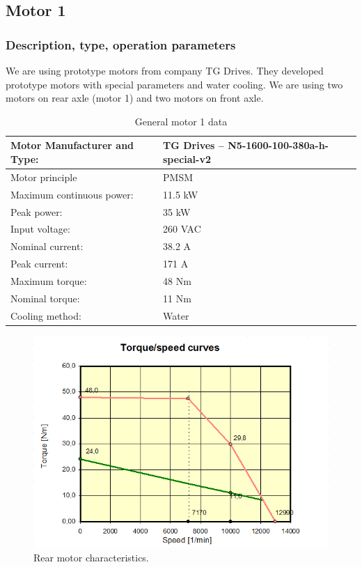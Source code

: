 \subsection{Motor 1}

\subsubsection{Description, type, operation parameters}

We are using prototype motors from company TG Drives. They developed prototype motors with special parameters and water cooling. We are using two motors on rear axle (motor 1) and two motors on front axle.
\begin{table}[H]
	\centering
	\caption{General motor 1 data}
	\begin{tabularx}{\textwidth}{|X|X|}\hline
		Motor Manufacturer and Type: & TG Drives – N5-1600-100-380a-h-special-v2 \\[\TableSize]\hline
		Motor principle & PMSM \\[\TableSize]\hline
		Maximum continuous power: & 11.5 kW \\[\TableSize]\hline
		Peak power: & 35 kW \\[\TableSize]\hline
		Input voltage: & 260 VAC \\[\TableSize]\hline
		Nominal current: & 38.2 A \\[\TableSize]\hline
		Peak current: & 171 A \\[\TableSize]\hline
		Maximum torque: & 48 Nm \\[\TableSize]\hline
		Nominal torque: & 11 Nm \\[\TableSize]\hline
		Cooling method: & Water \\[\TableSize]\hline
	\end{tabularx}%
	\label{tab:motors1-general}%
\end{table}%

\begin{figure}[H]
	\centering
	\includegraphics[width=\textwidth]{./img/MOTOR1-torque.png}
	\caption{Rear motor characteristics.}
	\label{fig:torque1}
\end{figure}

